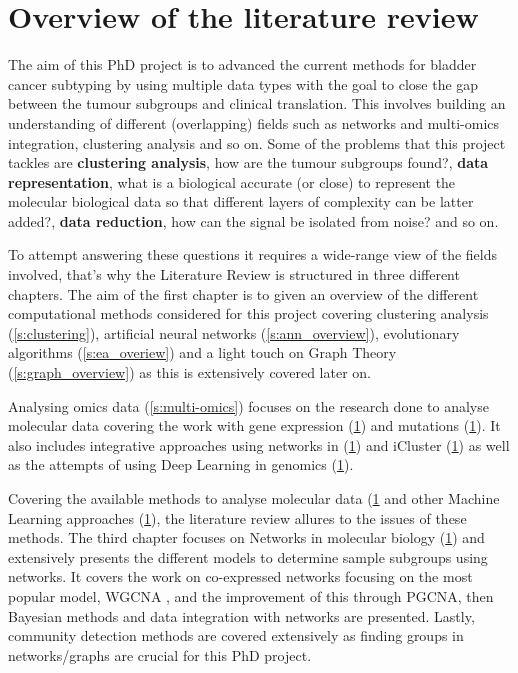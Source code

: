 

\section{Overview of the literature review}


The aim of this PhD project is to advanced the current methods for bladder cancer subtyping by using multiple data types with the goal to close the gap between the tumour subgroups and clinical translation. This involves building an understanding of different (overlapping) fields such as networks and multi-omics integration, clustering analysis and so on. Some of the problems that this project tackles are \textbf{clustering analysis}, how are the tumour subgroups found?, \textbf{data representation}, what is a biological accurate (or close) to represent the molecular biological data so that different layers of complexity can be latter added?, \textbf{data reduction}, how can the signal be isolated from noise? and so on.

To attempt answering these questions it requires a wide-range view of the fields involved, that's why the Literature Review is structured in three different chapters. The aim of the first chapter is to given an overview of the different computational methods considered for this project covering clustering analysis (\ref{s:clustering}), artificial neural networks (\ref{s:ann_overview}), evolutionary algorithms (\ref{s:ea_overiew}) and a light touch on Graph Theory (\ref{s:graph_overview}) as this is extensively covered later on.

Analysing omics data (\ref{s:multi-omics}) focuses on the research done to analyse molecular data covering the work with gene expression (\ref{}) and mutations (\ref{}). It also includes integrative approaches using networks in (\ref{}) and iCluster (\ref{}) as well as the attempts of using Deep Learning in genomics (\ref{}). 

Covering the available methods to analyse molecular data (\ref{} and other Machine Learning approaches (\ref{}), the literature review allures to the issues of these methods. The third chapter focuses on Networks in molecular biology (\ref{}) and extensively presents the different models to determine sample subgroups using networks. It covers the work on co-expressed networks focusing on the most popular model, WGCNA \citet{Langfelder2008-sn}, and the improvement of this through PGCNA\citet{Care2019-ij}, then Bayesian methods and data integration with networks are presented. Lastly, community detection methods are covered extensively as finding groups in networks/graphs are crucial for this PhD project.






